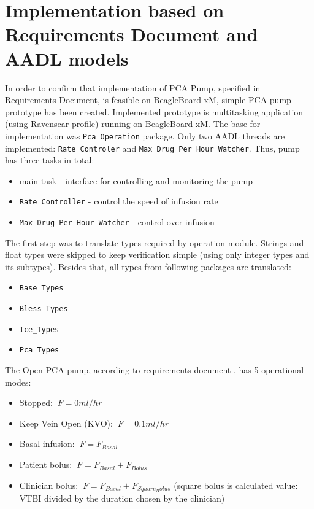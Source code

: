 \section{Implementation based on Requirements Document and AADL models}
\label{pcapumpimpl:manual}

In order to confirm that implementation of PCA Pump, specified in Requirements Document, is feasible on BeagleBoard-xM, simple PCA pump prototype has been created. Implemented prototype is multitasking application (using Ravenscar profile) running on BeagleBoard-xM. The base for implementation was \lstinline{Pca_Operation} package. Only two AADL threads are implemented: \lstinline{Rate_Controler} and \lstinline{Max_Drug_Per_Hour_Watcher}. Thus, pump has three tasks in total:
\begin{itemize}
    \item main task - interface for controlling and monitoring the pump
    \item \lstinline{Rate_Controller} - control the speed of infusion rate
    \item \lstinline{Max_Drug_Per_Hour_Watcher} - control over infusion
\end{itemize}

The first step was to translate types required by operation module. Strings and float types were skipped to keep verification simple (using only integer types and its subtypes). Besides that, all types from following packages are translated:
\begin{itemize}
	\item \lstinline{Base_Types}
	\item \lstinline{Bless_Types}
	\item \lstinline{Ice_Types}
	\item \lstinline{Pca_Types}
\end{itemize}

The Open PCA pump, according to requirements document \cite{PcaReq}, has 5 operational modes:
\begin{itemize}
	\item Stopped: $\displaystyle\ F = 0 ml/hr$
	\item Keep Vein Open (KVO): $\displaystyle\ F = 0.1 ml/hr$
	\item Basal infusion: $\displaystyle\ F = F_{Basal}$
	\item Patient bolus: $\displaystyle\ F = F_{Basal} + F_{Bolus}$
	\item Clinician bolus: $\displaystyle\ F = F_{Basal} + F_{Square_Bolus}$ (square bolus is calculated value: VTBI divided by the duration chosen by the clinician)
\end{itemize}

